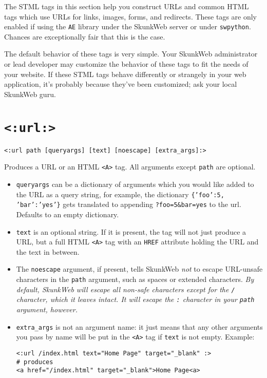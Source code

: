 \documentclass{manual}
\begin{document}
The STML tags in this section help you construct URLs and common HTML
tags which use URLs for links, images, forms, and redirects.  These
tags are only enabled if using the \texttt{AE} library under the
SkunkWeb server or under \texttt{swpython}.  Chances are exceptionally
fair that this is the case.

The default behavior of these tags is very simple.  Your SkunkWeb
administrator or lead developer may customize the behavior of these
tags to fit the needs of your website.  If these STML tags behave
differently or strangely in your web application, it's probably
because they've been customized; ask your local SkunkWeb guru.

\section{\texttt{<:url:>}}
\label{tagurl}

\begin{verbatim}<:url path [queryargs] [text] [noescape] [extra_args]:>\end{verbatim}

Produces a URL or an HTML \texttt{<A>} tag. 
All arguments except \texttt{path} are optional.

\begin{itemize}
\item \texttt{queryargs} can be a dictionary of arguments which you
would like added to the URL as a query string, for example, the
dictionary \texttt{\{'foo':5, 'bar':'yes'\}} gets translated to
appending \texttt{?foo=5\&bar=yes} to the url. Defaults to an empty
dictionary.

\item \texttt{text} is an optional string. If it is present, the tag
will not just produce a URL, but a full HTML \texttt{<A>}
tag with an \texttt{HREF} attribute holding the URL and the text in
between. 

\item The \texttt{noescape} argument, if present,
tells SkunkWeb \emph{not} to escape URL-unsafe characters in the \texttt{path}
argument, such as spaces or extended characters. \emph{By default,
SkunkWeb will escape all non-safe characters except for the \texttt{/}
character, which it leaves intact. It will escape the \texttt{:}
character in your \texttt{path} argument, however.}


\item \texttt{extra_args} is not an argument name: it just means 
that any other arguments you pass by name will be put in the
\texttt{<A>} tag if \texttt{text} is not empty. Example:

\begin{verbatim}<:url /index.html text="Home Page" target="_blank" :>
# produces
<a href="/index.html" target="_blank">Home Page<a>
\end{verbatim}



\end{itemize}
\end{document}
